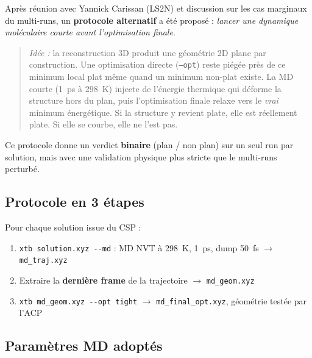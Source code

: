 \documentclass[12pt,a4paper]{article}
\theoremstyle{definition}
\begin{document}
Après réunion avec Yannick Carissan (LS2N) et discussion sur les cas marginaux du
multi-runs, un \textbf{protocole alternatif} a été proposé :
\textit{lancer une dynamique moléculaire courte avant l'optimisation finale}.

\begin{quote}
\textit{Idée :} la reconstruction 3D produit une géométrie 2D plane par construction.
Une optimisation directe (\texttt{--opt}) reste piégée près de ce minimum local plat
même quand un minimum non-plat existe. La MD courte (1~ps à 298~K) injecte de
l'énergie thermique qui déforme la structure hors du plan, puis l'optimisation finale
relaxe vers le \emph{vrai} minimum énergétique. Si la structure y revient plate, elle est
réellement plate. Si elle se courbe, elle ne l'est pas.
\end{quote}

Ce protocole donne un verdict \textbf{binaire} (plan / non plan) sur un seul run par solution,
mais avec une validation physique plus stricte que le multi-runs perturbé.

\subsection{Protocole en 3 étapes}

Pour chaque solution issue du CSP :

\begin{enumerate}
  \item \texttt{xtb solution.xyz -{}-md} : MD NVT à 298~K, 1~ps, dump 50~fs $\to$ \texttt{md\_traj.xyz}
  \item Extraire la \textbf{dernière frame} de la trajectoire $\to$ \texttt{md\_geom.xyz}
  \item \texttt{xtb md\_geom.xyz -{}-opt tight} $\to$ \texttt{md\_final\_opt.xyz}, géométrie testée par l'ACP
\end{enumerate}

\subsection{Paramètres MD adoptés}
\end{document}
